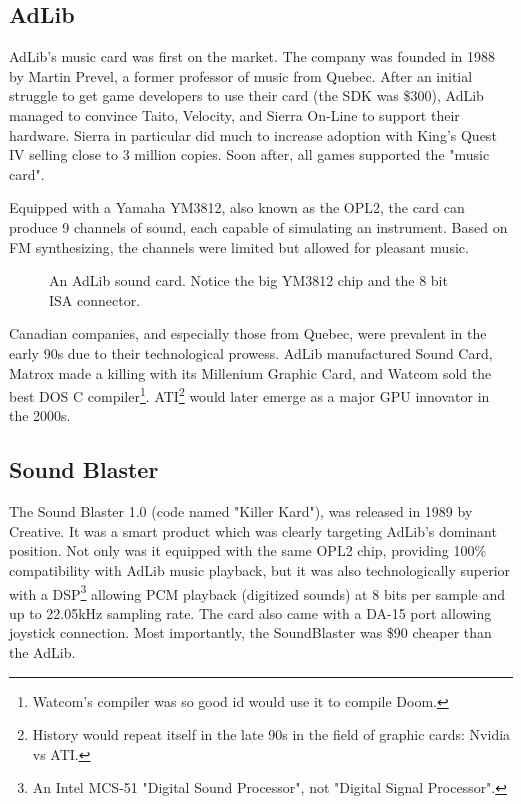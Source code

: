 \documentclass[book.tex]{subfiles}
\begin{document}
  \subsection{AdLib}
  AdLib's music card was first on the market. The company was founded in 1988 by Martin Prevel, a former professor of music from Quebec. After an initial struggle to get game developers to use their card (the SDK was \$300), AdLib managed to convince Taito, Velocity, and Sierra On-Line to support their hardware. Sierra in particular did much to increase adoption with King's Quest IV selling close to 3 million copies. Soon after, all games supported the "music card".\\
  \par
   Equipped with a Yamaha YM3812, also known as the OPL2, the card can produce 9 channels of sound, each capable of simulating an instrument. Based on FM synthesizing, the channels were limited but allowed for pleasant music.\\
  \begin{figure}[H] 
    \centering 
    \caption{An AdLib sound card. Notice the big YM3812 chip and the 8 bit ISA connector.}
  \end{figure}
   
\par
{} Canadian companies, and especially those from Quebec, were prevalent in the early 90s due to their technological prowess. AdLib manufactured Sound Card, Matrox made a killing with its Millenium Graphic Card, and Watcom sold the best DOS C compiler\footnote{Watcom's compiler was so good id would use it to compile Doom.}. ATI\footnote{History would repeat itself in the late 90s in the field of graphic cards: Nvidia vs ATI.} would later emerge as a major GPU innovator in the 2000s.\\
  
  


  \subsection{Sound Blaster}
  The Sound Blaster 1.0 (code named "Killer Kard"), was released in 1989 by Creative. It was a smart product which was clearly targeting AdLib's dominant position. Not only was it equipped with the same OPL2 chip, providing 100\% compatibility with AdLib music playback, but it was also technologically superior with a DSP\footnote{An Intel MCS-51 "Digital Sound Processor", not "Digital Signal Processor".}  allowing PCM playback (digitized sounds) at 8 bits per sample and up to 22.05kHz sampling rate. The card also came with a DA-15 port allowing joystick connection. Most importantly, the SoundBlaster was \$90 cheaper than the AdLib.\\ 
\par
\end{document}
